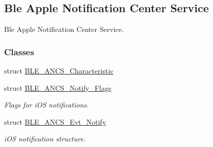 \hypertarget{group___b_l_e___a_n_c_s}{}\subsection{Ble Apple Notification Center Service}
\label{group___b_l_e___a_n_c_s}


Ble Apple Notification Center Service.  


\subsubsection*{Classes}
\begin{DoxyCompactItemize}
\item 
struct \hyperlink{struct_b_l_e___a_n_c_s___characteristic}{B\+L\+E\+\_\+\+A\+N\+C\+S\+\_\+\+Characteristic}
\item 
struct \hyperlink{struct_b_l_e___a_n_c_s___notify___flags}{B\+L\+E\+\_\+\+A\+N\+C\+S\+\_\+\+Notify\+\_\+\+Flags}
\begin{DoxyCompactList}\small\item\em Flags for i\+OS notifications. \end{DoxyCompactList}\item 
struct \hyperlink{struct_b_l_e___a_n_c_s___evt___notify}{B\+L\+E\+\_\+\+A\+N\+C\+S\+\_\+\+Evt\+\_\+\+Notify}
\begin{DoxyCompactList}\small\item\em i\+OS notification structure. \end{DoxyCompactList}\end{DoxyCompactItemize}
